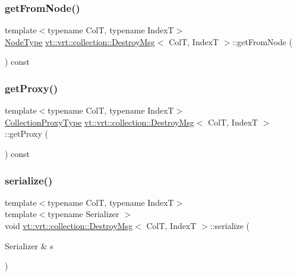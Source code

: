 \subsubsection{\texorpdfstring{get\+From\+Node()}{getFromNode()}}
{\footnotesize\ttfamily template$<$typename ColT, typename IndexT$>$ \\
\hyperlink{namespacevt_a866da9d0efc19c0a1ce79e9e492f47e2}{Node\+Type} \hyperlink{structvt_1_1vrt_1_1collection_1_1_destroy_msg}{vt\+::vrt\+::collection\+::\+Destroy\+Msg}$<$ ColT, IndexT $>$\+::get\+From\+Node (\begin{DoxyParamCaption}{ }\end{DoxyParamCaption}) const\hspace{0.3cm}{\ttfamily [inline]}}

\mbox{\label{structvt_1_1vrt_1_1collection_1_1_destroy_msg_a57e8fd346b3298e9472cccbda65ed1d8}} 
\subsubsection{\texorpdfstring{get\+Proxy()}{getProxy()}}
{\footnotesize\ttfamily template$<$typename ColT, typename IndexT$>$ \\
\hyperlink{structvt_1_1vrt_1_1collection_1_1_destroy_msg_a5bf089cacadf94e55e9ae797c4cd0462}{Collection\+Proxy\+Type} \hyperlink{structvt_1_1vrt_1_1collection_1_1_destroy_msg}{vt\+::vrt\+::collection\+::\+Destroy\+Msg}$<$ ColT, IndexT $>$\+::get\+Proxy (\begin{DoxyParamCaption}{ }\end{DoxyParamCaption}) const\hspace{0.3cm}{\ttfamily [inline]}}

\mbox{\label{structvt_1_1vrt_1_1collection_1_1_destroy_msg_a112e71fb4a34cf0229b78ad36aa4d4ef}} 
\subsubsection{\texorpdfstring{serialize()}{serialize()}}
{\footnotesize\ttfamily template$<$typename ColT, typename IndexT$>$ \\
template$<$typename Serializer $>$ \\
void \hyperlink{structvt_1_1vrt_1_1collection_1_1_destroy_msg}{vt\+::vrt\+::collection\+::\+Destroy\+Msg}$<$ ColT, IndexT $>$\+::serialize (\begin{DoxyParamCaption}\item[{Serializer \&}]{s }\end{DoxyParamCaption})\hspace{0.3cm}{\ttfamily [inline]}}

